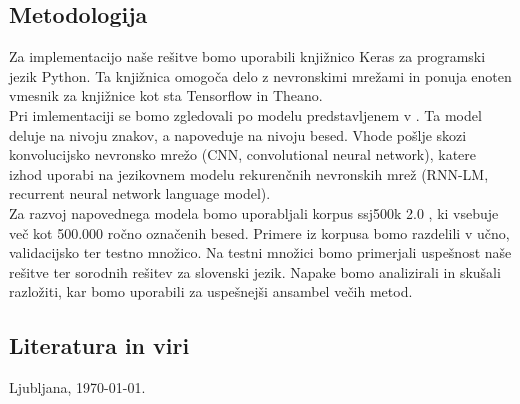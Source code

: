 \documentclass[a4paper, 12pt]{article}
\begin{document}
\subsection{Metodologija}

Za implementacijo naše rešitve bomo uporabili knjižnico Keras za programski jezik Python. Ta knjižnica omogoča delo z nevronskimi mrežami in ponuja enoten vmesnik za knjižnice kot sta Tensorflow in Theano.\\
Pri imlementaciji se bomo zgledovali po modelu predstavljenem v \cite{Kim2016}. Ta model deluje na nivoju znakov, a napoveduje na nivoju besed. Vhode pošlje skozi konvolucijsko nevronsko mrežo (CNN, convolutional neural network), katere izhod uporabi na jezikovnem modelu rekurenčnih nevronskih mrež (RNN-LM, recurrent neural network language model).\\
Za razvoj napovednega modela bomo uporabljali korpus ssj500k 2.0 \cite{ssj500kv2}, ki vsebuje več kot 500.000 ročno označenih besed. Primere iz korpusa bomo razdelili v učno, validacijsko ter testno množico. Na testni množici bomo primerjali uspešnost naše rešitve ter sorodnih rešitev za slovenski jezik. Napake bomo analizirali in skušali razložiti, kar bomo uporabili za uspešnejši ansambel večih metod.

\subsection{Literatura in viri}
\label{literatura}

\renewcommand\refname{}
\vspace{-50px}




\bigskip

Ljubljana, \today .
\end{document}
